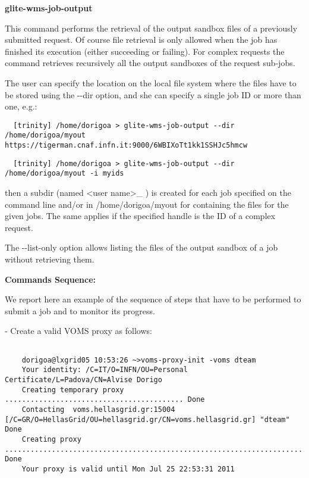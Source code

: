 \textbf{glite-wms-job-output}

  This command performs the retrieval of the output sandbox files of a previously submitted request. Of course 
  file retrieval is only allowed when the job has finished its execution (either succeeding or failing).
  For complex requests the command retrieves recursively all the output sandboxes of the request sub-jobs.

  The user can specify the location on the local file system where the files have to be stored using the -{}-dir  option, and she
  can specify a single job ID or more than one, e.g.:
\begin{scriptsize}
\begin{verbatim}
  [trinity] /home/dorigoa > glite-wms-job-output --dir /home/dorigoa/myout https://tigerman.cnaf.infn.it:9000/6WBIXoTt1kk1SSHJc5hmcw
\end{verbatim}
\end{scriptsize}
\begin{scriptsize}
\begin{verbatim}
  [trinity] /home/dorigoa > glite-wms-job-output --dir /home/dorigoa/myout -i myids
\end{verbatim}
\end{scriptsize}
  then a subdir (named <user name>\_<jobId unique string> ) is created for each job specified on the command line and/or in /home/dorigoa/myout for containing
  the files for the given jobs. The same applies if the specified handle is the ID of a complex request.

  The -{}-list-only  option allows listing the files of the output sandbox of a job without retrieving them.



\textbf{Commands Sequence:}


 We report here an example of the sequence of steps that have to be performed to submit a job and to monitor 
 its progress.

 - Create a valid VOMS proxy as follows:
\begin{scriptsize}
\begin{verbatim}

	dorigoa@lxgrid05 10:53:26 ~>voms-proxy-init -voms dteam
	Your identity: /C=IT/O=INFN/OU=Personal Certificate/L=Padova/CN=Alvise Dorigo
	Creating temporary proxy .......................................... Done
	Contacting  voms.hellasgrid.gr:15004 [/C=GR/O=HellasGrid/OU=hellasgrid.gr/CN=voms.hellasgrid.gr] "dteam" Done
	Creating proxy ............................................................................... Done
	Your proxy is valid until Mon Jul 25 22:53:31 2011

\end{verbatim}
\end{scriptsize}

